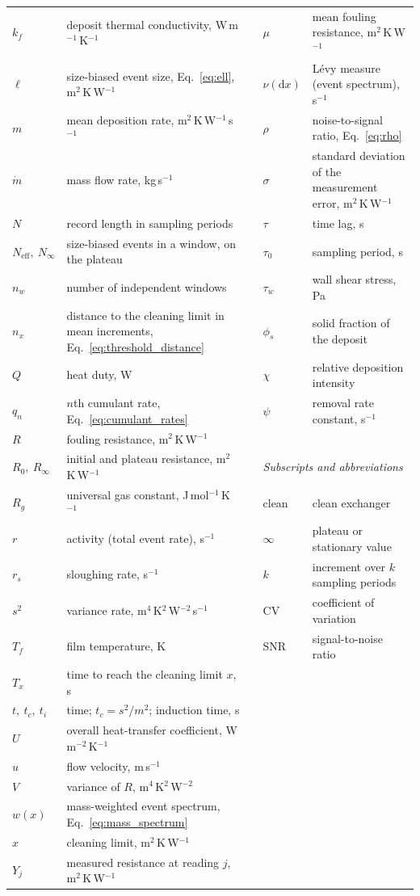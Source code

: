 \begin{table}[tb]
\begin{tabular*}{\textwidth}{@{\extracolsep{\fill}}l p{} l l p{}}
$k_f$ & deposit thermal conductivity, W\,m$^{-1}$\,K$^{-1}$ & & $\mu$ & mean fouling resistance, m$^2$\,K\,W$^{-1}$\\
$\ell$ & size-biased event size, Eq.~\eqref{eq:ell}, m$^2$\,K\,W$^{-1}$ & & $\nu(\mathrm dx)$ & L\'evy measure (event spectrum), s$^{-1}$\\
$m$ & mean deposition rate, m$^2$\,K\,W$^{-1}$\,s$^{-1}$ & & $\rho$ & noise-to-signal ratio, Eq.~\eqref{eq:rho}\\
$\dot m$ & mass flow rate, kg\,s$^{-1}$ & & $\sigma$ & standard deviation of the measurement error, m$^2$\,K\,W$^{-1}$\\
$N$ & record length in sampling periods & & $\tau$ & time lag, s\\
$N_{\mathrm{eff}},\ N_\infty$ & size-biased events in a window, on the plateau & & $\tau_0$ & sampling period, s\\
$n_w$ & number of independent windows & & $\tau_w$ & wall shear stress, Pa\\
$n_x$ & distance to the cleaning limit in mean increments, Eq.~\eqref{eq:threshold_distance} & & $\phi_s$ & solid fraction of the deposit\\
$Q$ & heat duty, W & & $\chi$ & relative deposition intensity\\
$q_n$ & $n$th cumulant rate, Eq.~\eqref{eq:cumulant_rates} & & $\psi$ & removal rate constant, s$^{-1}$\\
$R$ & fouling resistance, m$^2$\,K\,W$^{-1}$ & & & \\
$R_0,\ R_\infty$ & initial and plateau resistance, m$^2$\,K\,W$^{-1}$ & & \multicolumn{2}{l}{\emph{Subscripts and abbreviations}}\\
$R_g$ & universal gas constant, J\,mol$^{-1}$\,K$^{-1}$ & & clean & clean exchanger\\
$r$ & activity (total event rate), s$^{-1}$ & & $\infty$ & plateau or stationary value\\
$r_s$ & sloughing rate, s$^{-1}$ & & $k$ & increment over $k$ sampling periods\\
$s^2$ & variance rate, m$^4$\,K$^2$\,W$^{-2}$\,s$^{-1}$ & & CV & coefficient of variation\\
$T_f$ & film temperature, K & & SNR & signal-to-noise ratio\\
$T_x$ & time to reach the cleaning limit $x$, s & & & \\
$t,\ t_c,\ t_i$ & time; $t_c=s^2/m^2$; induction time, s & & & \\
$U$ & overall heat-transfer coefficient, W\,m$^{-2}$\,K$^{-1}$ & & & \\
$u$ & flow velocity, m\,s$^{-1}$ & & & \\
$V$ & variance of $R$, m$^4$\,K$^2$\,W$^{-2}$ & & & \\
$w(x)$ & mass-weighted event spectrum, Eq.~\eqref{eq:mass_spectrum} & & & \\
$x$ & cleaning limit, m$^2$\,K\,W$^{-1}$ & & & \\
$Y_j$ & measured resistance at reading $j$, m$^2$\,K\,W$^{-1}$ & & & \\
\bottomrule
\end{tabular*}
\end{table}
